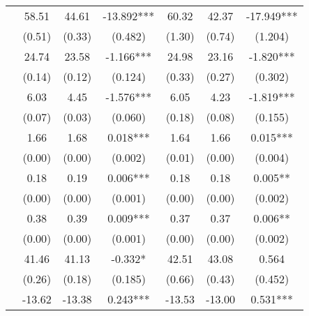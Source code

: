 \begin{table}
\begin{threeparttable}
\begin{tabular}{p{4cm}S@{}S@{}S[round-precision=3]S@{}S@{}S[round-precision=3]}
            &       58.51&       44.61&     -13.892***&       60.32&       42.37&     -17.949***\\
                                          &      (0.51)&      (0.33)&     (0.482)   &      (1.30)&      (0.74)&     (1.204)   \\
            \midrule
            &       24.74&       23.58&      -1.166***&       24.98&       23.16&      -1.820***\\
                                          &      (0.14)&      (0.12)&     (0.124)   &      (0.33)&      (0.27)&     (0.302)   \\
            &        6.03&        4.45&      -1.576***&        6.05&        4.23&      -1.819***\\
                                          &      (0.07)&      (0.03)&     (0.060)   &      (0.18)&      (0.08)&     (0.155)   \\
            &        1.66&        1.68&       0.018***&        1.64&        1.66&       0.015***\\
                                          &      (0.00)&      (0.00)&     (0.002)   &      (0.01)&      (0.00)&     (0.004)   \\
            &        0.18&        0.19&       0.006***&        0.18&        0.18&       0.005** \\
                                          &      (0.00)&      (0.00)&     (0.001)   &      (0.00)&      (0.00)&     (0.002)   \\
            &        0.38&        0.39&       0.009***&        0.37&        0.37&       0.006** \\
                                          &      (0.00)&      (0.00)&     (0.001)   &      (0.00)&      (0.00)&     (0.002)   \\
            \midrule
            &       41.46&       41.13&      -0.332*  &       42.51&       43.08&       0.564   \\
                                          &      (0.26)&      (0.18)&     (0.185)   &      (0.66)&      (0.43)&     (0.452)   \\
                &      -13.62&      -13.38&       0.243***&      -13.53&      -13.00&       0.531***\\

\end{tabular}
\end{threeparttable}
\end{table}
